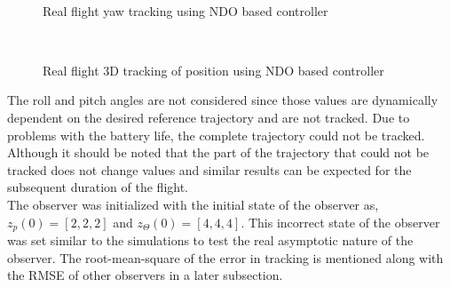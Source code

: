\documentclass[letterpaper%
, twoside%
, 12pt%
,memoire%
, english%
,creativecommons,hyperref%
]{thETS}
\begin{document}
\begin{figure}[H]
	\centering
	 \\ \parbox{0.85\textwidth}{\caption{Real flight yaw tracking using NDO based controller\label{Fig:yawtracNDO}}}
\end{figure}
\begin{figure}[H]
	\centering
	 \\ \parbox{0.75\textwidth}{\caption{Real flight 3D tracking of position using NDO based controller\label{Fig:3dNDO}}}
\end{figure}
The roll and pitch angles are not considered since those values are dynamically dependent on the desired reference trajectory and are not tracked. Due to problems with the battery life, the complete trajectory could not be tracked. Although it should be noted that the part of the trajectory that could not be tracked does not change values and similar results can be expected for the subsequent duration of the flight. \\
The observer was initialized with the initial state of the observer as, $z_p(0)=[2,2,2]$ and $z_\Theta(0)=[4,4,4]$. This incorrect state of the observer was set similar to the simulations to test the real asymptotic nature of the observer. The root-mean-square of the error in tracking is mentioned along with the RMSE of other observers in a later subsection.
\FloatBarrier
\end{document}
